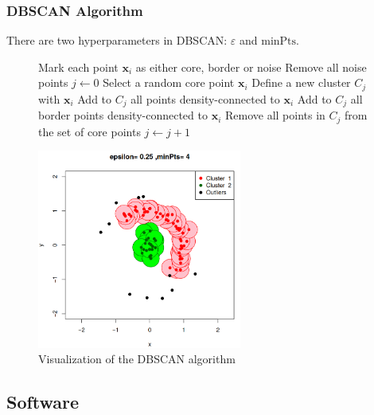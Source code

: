 \subsubsection{DBSCAN Algorithm}

\begin{marker}
There are two hyperparameters in DBSCAN: $\varepsilon$ and $\text{minPts}$.
\end{marker}

\begin{figure}[H]
    \begin{algorithmic}[1]
        \State Mark each point $\boldsymbol{x}_i$ as either core, border or noise
        \State Remove all noise points
        \State $j \gets 0$
            \State Select a random core point $\boldsymbol{x}_i$
            \State Define a new cluster $C_j$ with $\boldsymbol{x}_i$
            \State Add to $C_j$ all points density-connected to $\boldsymbol{x}_i$
            \State Add to $C_j$ all border points density-connected to $\boldsymbol{x}_i$
            \State Remove all points in $C_j$ from the set of core points
            \State $j \gets j + 1$
        \EndWhile
    \EndProcedure
\end{algorithmic}
\end{figure}

\begin{figure}[H]
    \includegraphics[width=0.6\textwidth]{../figures/dbscan_eps_minpts}
    \caption{Visualization of the DBSCAN algorithm}
\end{figure}

\subsection{Software}

